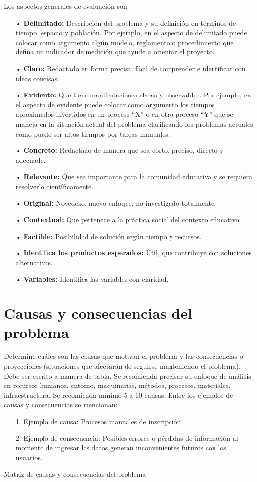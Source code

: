 \documentclass[12pt, a4paper, nofontenc, numbers=endperiod]{apa7}
\begin{document}
{		\setlength{\parindent}{1.27cm}Los aspectos generales de evaluación son:
{\doublespacing
	\begin{itemize}[leftmargin=1.70cm]
		\item[•] \textbf{Delimitado:} Descripción del problema y su definición en términos de tiempo, espacio y población. Por ejemplo, en el aspecto de delimitado puede colocar como argumento algún modelo, reglamento o procedimiento que defina un indicador de medición que ayude a orientar el proyecto.
		\item[•] \textbf{Claro:} Redactado en forma precisa, fácil de comprender e identificar con ideas concisas.
		\item[•] \textbf{Evidente:} Que tiene manifestaciones claras y observables. Por ejemplo, en el aspecto de evidente puede colocar como argumento los tiempos aproximados invertidos en un proceso “X” o en otro proceso “Y” que se maneja en la situación actual del problema clarificando los problemas actuales como puede ser altos tiempos por tareas manuales.
		\item[•] \textbf{Concreto:} Redactado de manera que sea corto, preciso, directo y adecuado.
		\item[•] \textbf{Relevante:} Que sea importante para la comunidad educativa y se requiera resolverlo científicamente.
		\item[•] \textbf{Original:} Novedoso, nuevo enfoque, no investigado totalmente.
		\item[•] \textbf{Contextual:} Que pertenece a la práctica social del contexto educativo.
		\item[•] \textbf{Factible:} Posibilidad de solución según tiempo y recursos.
		\item[•] \textbf{Identifica los productos esperados:} Útil, que contribuye con soluciones alternativas.
		\item[•] \textbf{Variables:} Identifica las variables con claridad.
	\end{itemize}
}
	\section{\normalsize \centering Causas y consecuencias del problema} 
	\setlength{\parindent}{1.27cm}Determine cuáles son las causas que motivan el problema y las consecuencias o proyecciones (situaciones que afectarán de seguirse manteniendo el problema).
	Debe ser escrito a manera de tabla. Se recomienda precisar su enfoque de análisis en recursos humanos, entorno, maquinarias, métodos, procesos, materiales, infraestructura. Se recomienda mínimo 5 a 10 causas. Entre los ejemplos de causas y consecuencias se mencionan:
	{\doublespacing	
	\begin{itemize}[leftmargin=1.70cm]
		\item[1.] Ejemplo de causa: Procesos manuales de inscripción.
		\item[2.] Ejemplo de consecuencia: Posibles errores o pérdidas de información al momento de ingresar los datos generan inconvenientes futuros con los usuarios.
	\end{itemize}
}
	\begin{table}[h]
		\caption{Matriz de causas y consecuencias del problema}
		\label{Tabla2} %


\end{table}}
\end{document}
